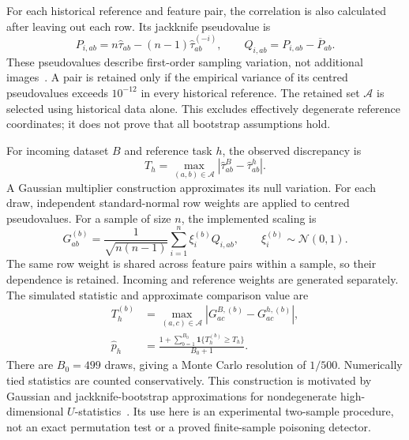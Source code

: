 For each historical reference and feature pair, the correlation is also
calculated after leaving out each row. Its jackknife pseudovalue is
\begin{equation}
    P_{i,ab}=n\widehat{\tau}_{ab}-(n-1)\widehat{\tau}_{ab}^{(-i)},
    \qquad
    Q_{i,ab}=P_{i,ab}-\overline{P}_{ab}.
    \label{eq:methods-jackknife}
\end{equation}
These pseudovalues describe first-order sampling variation, not additional
images~\cite{efron1981jackknife}. A pair is retained only if the empirical
variance of its centred pseudovalues exceeds $10^{-12}$ in every historical
reference. The retained set $\mathcal{A}$ is selected using historical
data alone. This excludes effectively degenerate reference coordinates; it
does not prove that all bootstrap assumptions hold.

For incoming dataset $B$ and reference task $h$, the observed discrepancy is
\begin{equation}
    T_h=\max_{(a,b)\in\mathcal{A}}
         |\widehat{\tau}_{ab}^{B}-\widehat{\tau}_{ab}^{h}|.
    \label{eq:methods-rank-statistic}
\end{equation}
A Gaussian multiplier construction approximates its null variation. For
each draw, independent standard-normal row weights are applied to centred
pseudovalues. For a sample of size $n$, the implemented scaling is
\begin{equation}
    G_{ab}^{(b)}=
       \frac{1}{\sqrt{n(n-1)}}\sum_{i=1}^{n}\xi_i^{(b)}Q_{i,ab},
       \qquad \xi_i^{(b)}\sim\mathcal{N}(0,1).
    \label{eq:methods-multiplier}
\end{equation}
The same row weight is shared across feature pairs within a sample, so
their dependence is retained. Incoming and reference weights are generated
separately. The simulated statistic and approximate comparison value are
\begin{align}
    T_h^{(b)}&=\max_{(a,c)\in\mathcal{A}}
        |G_{ac}^{B,(b)}-G_{ac}^{h,(b)}|,\\
    \widehat{p}_h&=
        \frac{1+\sum_{b=1}^{B_0}\mathbf{1}\{T_h^{(b)}\geq T_h\}}
             {B_0+1}.
    \label{eq:methods-rank-pvalue}
\end{align}
There are $B_0=499$ draws, giving a Monte Carlo resolution of $1/500$.
Numerically tied statistics are counted conservatively.
This construction is motivated by Gaussian and jackknife-bootstrap
approximations for nondegenerate high-dimensional
$U$-statistics~\cite{chen2018bootstrap}. Its use here is an experimental
two-sample procedure, not an exact permutation test or a proved
finite-sample poisoning detector.

